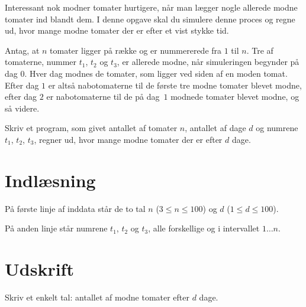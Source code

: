 
Interessant nok modner tomater hurtigere, når man lægger nogle allerede modne tomater ind blandt dem.
I denne opgave skal du simulere denne proces og regne ud, hvor mange modne tomater der er efter et vist stykke tid.

Antag, at $n$ tomater ligger på række og er nummererede fra $1$ til $n$.
Tre af tomaterne, nummer $t_1$, $t_2$ og $t_3$, er allerede modne, når simuleringen begynder på dag $0$.
Hver dag modnes de tomater, som ligger ved siden af en moden tomat.
Efter dag $1$ er altså nabotomaterne til de første tre modne tomater blevet modne, efter dag $2$ er nabotomaterne til de på dag~$1$ modnede tomater blevet modne, og så videre.

Skriv et program, som givet antallet af tomater $n$, antallet af dage $d$ og numrene $t_1$, $t_2$, $t_3$, regner ud, hvor mange modne tomater der er efter $d$ dage.

\section*{Indlæsning}

På første linje af inddata står de to tal $n$ ($3 \le n \le 100$) og $d$ ($1 \le d \le 100$).

På anden linje står numrene $t_1$, $t_2$ og $t_3$, alle forskellige og i intervallet $1 \dots n$.

\section*{Udskrift}
Skriv et enkelt tal: antallet af modne tomater efter $d$ dage.
